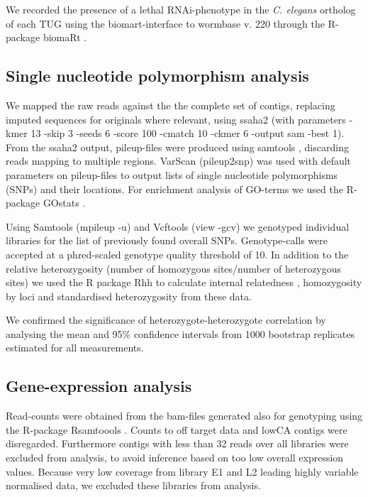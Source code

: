 \documentclass[10pt]{bmc_article}
\newenvironment{bmcformat}{\begin{raggedright}\baselineskip20pt\sloppy\setboolean{publ}{false}}{\end{raggedright}\baselineskip20pt\sloppy}
\begin{document}
\begin{bmcformat}
We recorded the presence of a lethal RNAi-phenotype in the
\textit{C. elegans} ortholog of each TUG using the biomart-interface
\cite{pmid22083790} to wormbase v. 220 through the R-package biomaRt
\cite{pmid19617889}.

\subsection*{Single nucleotide polymorphism analysis}

We mapped the raw reads against the the complete set of contigs,
replacing imputed sequences for originals where relevant, using ssaha2
\cite{pmid11591649} (with parameters -kmer 13 -skip 3 -seeds 6 -score
100 -cmatch 10 -ckmer 6 -output sam -best 1). From the ssaha2 output,
pileup-files were produced using samtools
\cite{journals/bioinformatics/LiHWFRHMAD09}, discarding reads mapping
to multiple regions. VarScan \cite{pmid19542151} (pileup2snp) was used
with default parameters on pileup-files to output lists of single
nucleotide polymorphisms (SNPs) and their locations. For enrichment
analysis of GO-terms we used the R-package GOstats
\cite{pmid17098774}.

Using Samtools \cite{journals/bioinformatics/LiHWFRHMAD09} (mpileup
-u) and Vcftools \cite{pmid21653522} (view -gcv) we genotyped
individual libraries for the list of previously found overall
SNPs. Genotype-calls were accepted at a phred-scaled genotype quality
threshold of 10. In addition to the relative heterozygosity (number of
homozygous sites/number of heterozygous sites) we used the R package
Rhh \cite{pmid21565077} to calculate internal relatedness
\cite{pmid11571049}, homozygosity by loci \cite{pmid17107491} and
standardised heterozygosity \cite{coltman81j} from these data.

We confirmed the significance of heterozygote-heterozygote correlation
by analysing the mean and 95\% confidence intervals from 1000
bootstrap replicates estimated for all measurements.

\subsection*{Gene-expression analysis}

Read-counts were obtained from the bam-files generated also for
genotyping using the R-package Rsamtoools \cite{rsamtools}. Counts to
off target data and lowCA contigs were disregarded. Furthermore
contigs with less than 32 reads over all libraries were excluded from
analysis, to avoid inference based on too low overall expression
values. Because very low coverage from library E1 and L2 leading
highly variable normalised data, we excluded these libraries from
analysis.


\end{bmcformat}
\end{document}
